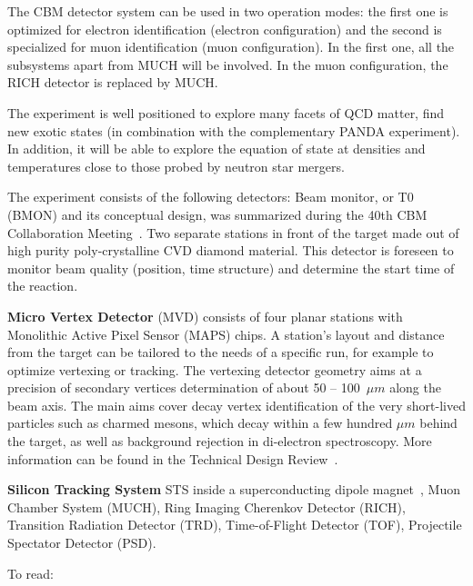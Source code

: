 The CBM detector system can be used in two operation modes: the first one is optimized for electron identification (electron configuration) and the second is specialized for muon identification (muon configuration). In the first one, all the subsystems apart from MUCH will be involved. In the muon configuration, the \gls{RICH} detector is replaced by \gls{MUCH}.

The experiment is  well positioned to explore many facets of \gls{QCD} matter, find new exotic states (in combination with the complementary \gls{PANDA} experiment). In addition, it will be able to explore the equation of state at densities and temperatures close to those probed by neutron star mergers.

The experiment consists of the following detectors:
Beam monitor, or T0 (\gls{BMON}) and its conceptual design, was summarized during the 40th \gls{CBM} Collaboration Meeting~\cite{bmon}. Two separate stations in front of the target made out of high purity poly-crystalline CVD diamond material. This detector is foreseen to monitor beam quality (position, time structure) and determine the start time of the reaction.

\textbf{Micro Vertex Detector} (\gls{MVD}) consists of four planar stations with Monolithic Active Pixel Sensor (\gls{MAPS}) chips. A station's layout and distance from the target can be tailored to the needs of a specific run, for example to optimize vertexing or tracking. The vertexing detector geometry aims at a precision of secondary vertices determination of about 50 -- 100~$\mu m$ along the beam axis. The main aims cover decay vertex identification of the very short-lived particles such as charmed mesons, which decay within a few hundred $\mu m$ behind the target, as well as background rejection in di-electron spectroscopy. More information can be found in the Technical Design Review~\cite{MVD}.

 \textbf{Silicon Tracking System} \gls{STS} inside a superconducting dipole magnet~\cite{Malakhov:109025},
 Muon Chamber System (\gls{MUCH}),
Ring Imaging Cherenkov Detector (\gls{RICH}),
 Transition Radiation Detector (\gls{TRD}),
 Time-of-Flight Detector (\gls{TOF}),
 Projectile Spectator Detector (\gls{PSD}).

To read:

